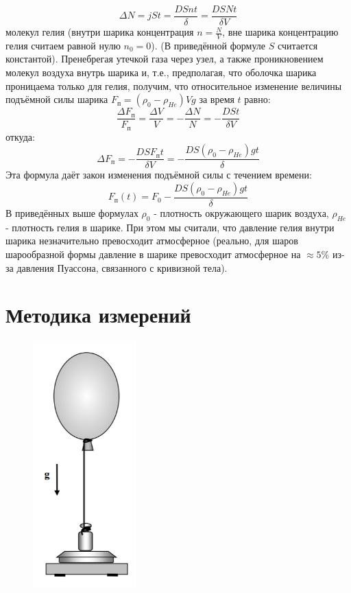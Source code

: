 \documentclass[a4paper,12pt]{article}
\begin{document}
\begin{equation}
\Delta N=jSt=\frac{DSnt}{\delta}=\frac{DSNt}{\delta V}
\end{equation}
молекул гелия (внутри шарика концентрация $n = \frac{N}{V}$, вне шарика концентрацию гелия считаем равной нулю $n_0=0$). (В приведённой формуле $S$ считается константой).
Пренебрегая утечкой газа через узел, а также проникновением молекул воздуха внутрь шарика и, т.е., предполагая, что оболочка шарика проницаема только для гелия, получим, что относительное изменение величины подъёмной силы шарика $F_п=(\rho_0-\rho_{He})Vg$ за время $t$ равно:
\begin{equation}
\frac {\Delta F_п}{ F_п} =\frac {\Delta V}{ V}=-\frac {\Delta N} {N}=-\frac{DSt}{\delta V}
\end{equation}
откуда:
\begin{equation}
\Delta F_п=-\frac{DS F_п t}{\delta V}=-\frac{DS (\rho_0-\rho_{He})gt}{\delta }
\end{equation}
Эта формула даёт закон изменения подъёмной силы с течением времени:
\begin{equation}
F_п(t)=F_0-\frac{DS (\rho_0-\rho_{He})gt}{\delta }
\end{equation}
В приведённых выше формулах $\rho_0$ - плотность окружающего шарик воздуха, $ \rho_{He}$ - плотность гелия в шарике. При этом мы считали, что давление гелия внутри шарика незначительно превосходит атмосферное (реально, для шаров шарообразной формы давление в шарике превосходит атмосферное на $\approx 5\%$ из-за давления Пуассона, связанного с кривизной тела).
\section{Методика измерений}

	
	
	\begin{figure} 
		\vspace{-4.5ex}
		\includegraphics[width=4cm]{sharik}
		\label{fig5}
	\end{figure}
\end{document}
